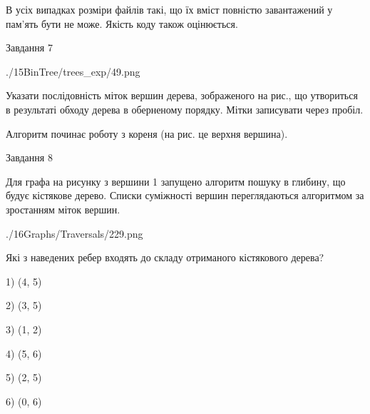 \documentclass[12pt, ukrainian]{article}
\begin{document}
{В усіх випадках розміри файлів такі, що їх вміст повністю завантажений у пам'ять бути не може. Якість коду також оцінюється.



\vspace{10mm}\par

\newpage
\begin{minipage}[t]{9.7cm}
               
{\begin{center}Завдання {7}\end{center}}
\vspace{-6mm}

\begin{center}
	{./15BinTree/trees_exp/49.png}
\end{center}
Указати послідовність міток вершин дерева, зображеного на рис., що утвориться в результаті обходу дерева в оберненому порядку. Мітки записувати через пробіл.\par Алгоритм починає роботу з кореня (на рис. це верхня вершина).\par

\end{minipage}
\vline \hspace{8mm}
\begin{minipage}[t]{8.0cm}
               
{\begin{center}Завдання {8}\end{center}}
\vspace{-6mm}
Для графа на рисунку з вершини 1 запущено алгоритм пошуку в глибину, що будує кістякове дерево. Списки суміжності вершин переглядаються алгоритмом за зростанням міток вершин.\par
\begin{center}
	{./16Graphs/Traversals/229.png}
\end{center}
\par Які з наведених ребер входять до складу отриманого кістякового дерева?\par
1) (4, 5)\par
2) (3, 5)\par
3) (1, 2)\par
4) (5, 6)\par
5) (2, 5)\par
6) (0, 6)\par
{\vskip 15pt} \par


\end{minipage}}
\end{document}
